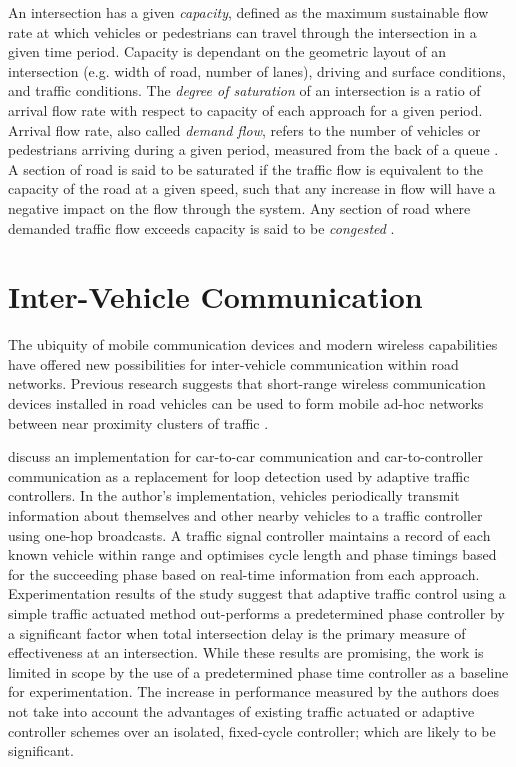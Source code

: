 \begin{appendices}
An intersection has a given \emph{capacity}, defined as the maximum sustainable flow rate at which vehicles or pedestrians can travel through the intersection in a given time period. Capacity is dependant on the geometric layout of an intersection (e.g. width of road, number of lanes), driving and surface conditions, and traffic conditions. The \emph{degree of saturation} of an intersection is a ratio of arrival flow rate with respect to capacity of each approach for a given period. Arrival flow rate, also called \emph{demand flow}, refers to the number of vehicles or pedestrians arriving during a given period, measured from the back of a queue \cite{sidraglossary}. A section of road is said to be saturated if the traffic flow is equivalent to the capacity of the road at a given speed, such that any increase in flow will have a negative impact on the flow through the system. Any section of road where demanded traffic flow exceeds capacity is said to be \emph{congested} \cite{wallis2013costs}.

\chapter{Inter-Vehicle Communication}

The ubiquity of mobile communication devices and modern wireless capabilities have offered new possibilities for inter-vehicle communication within road networks. Previous research suggests that short-range wireless communication devices installed in road vehicles can be used to form mobile ad-hoc networks between near proximity clusters of traffic \cite{adaptive2007grad,nadeem2004trafficview,yang2004vehicle}.

 discuss an implementation for car-to-car communication and car-to-controller communication as a replacement for loop detection used by adaptive traffic controllers. In the author's implementation, vehicles periodically transmit information about themselves and other nearby vehicles to a traffic controller using one-hop broadcasts. A traffic signal controller maintains a record of each known vehicle within range and optimises cycle length and phase timings based for the succeeding phase based on real-time information from each approach. Experimentation results of the study suggest that adaptive traffic control using a simple traffic actuated method out-performs a predetermined phase controller by a significant factor when total intersection delay is the primary measure of effectiveness at an intersection. While these results are promising, the work is limited in scope by the use of a predetermined phase time controller as a baseline for experimentation. The increase in performance measured by the authors does not take into account the advantages of existing traffic actuated or adaptive controller schemes over an isolated, fixed-cycle controller; which are likely to be significant. 


\end{appendices}
